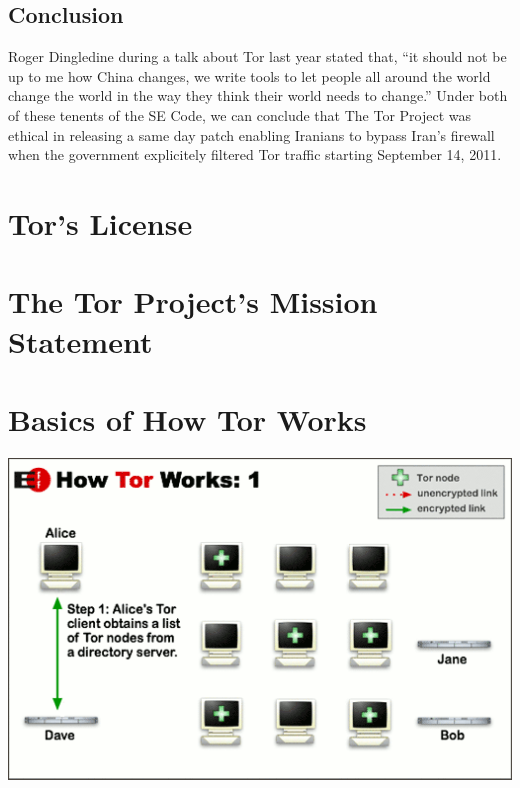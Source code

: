 \documentclass[11pt]{article}
\begin{document}
\begin{multicols}{2}
\section{Conclusion} 


Roger Dingledine during a talk about Tor last year stated that, ``it should not
be up to me how China changes, we write tools
to let people all around the world change the world in the way they think their
world needs to change.'' \cite{Tor:28c3} Under both of these
tenents of the SE Code, we can conclude that The Tor Project was ethical in
releasing a same day patch enabling Iranians to bypass Iran's firewall when the
government explicitely filtered Tor traffic starting September 14, 2011.


\end{multicols} \newpage

\appendix

\section{Tor's License}
\label{Tor:License}


\section{The Tor Project's Mission Statement}
\label{Tor:MissionStatement}



\section{Basics of How Tor Works}
\label{Tor:HowTorWorks}

\begin{center}
\includegraphics[natwidth=510bp,natheight=326bp,width= 0.7\linewidth]{appendix/htw1.png}
\end{center}

\end{document}
